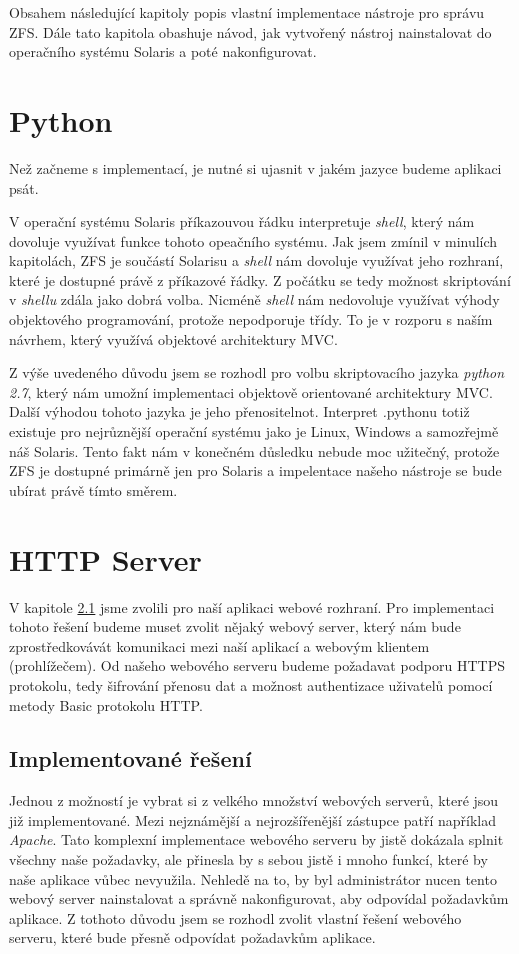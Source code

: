 Obsahem následující kapitoly popis vlastní implementace nástroje pro správu ZFS. Dále tato kapitola obashuje návod, jak vytvořený nástroj nainstalovat do operačního systému Solaris a poté nakonfigurovat.
\section{Python}
Než začneme s implementací, je nutné si ujasnit v jakém jazyce budeme aplikaci psát.

V operační systému Solaris příkazouvou řádku interpretuje \emph{shell}, který nám dovoluje využívat funkce tohoto opeačního systému. Jak jsem zmínil v minulích kapitolách, ZFS je součástí Solarisu a \emph{shell} nám dovoluje využívat jeho rozhraní, které je dostupné právě z příkazové řádky. Z počátku se tedy možnost skriptování v \emph{shellu} zdála jako dobrá volba. Nicméně \emph{shell} nám nedovoluje využívat výhody objektového programování, protože nepodporuje třídy. To je v rozporu s naším návrhem, který využívá objektové architektury MVC.

Z výše uvedeného důvodu jsem se rozhodl pro volbu skriptovacího jazyka \emph{python 2.7}, který nám umožní implementaci objektově orientované architektury MVC. Další výhodou tohoto jazyka je jeho přenositelnot. Interpret \emph.{pythonu} totiž existuje pro nejrůznější operační systému jako je Linux, Windows a samozřejmě náš Solaris. Tento fakt nám v konečném důsledku nebude moc užitečný, protože ZFS je dostupné primárně jen pro Solaris a impelentace našeho nástroje se bude ubírat právě tímto směrem.
\section{HTTP Server}
V kapitole \ref{} jsme zvolili pro naší aplikaci webové rozhraní. Pro implementaci tohoto řešení budeme muset zvolit nějaký webový server, který nám bude zprostředkovávát komunikaci mezi naší aplikací a webovým klientem (prohlížečem). Od našeho webového serveru budeme požadavat podporu HTTPS protokolu, tedy šifrování přenosu dat a možnost authentizace uživatelů pomocí metody Basic protokolu HTTP.
    \subsection{Implementované řešení}
    Jednou z možností je vybrat si z velkého množství webových serverů, které jsou již implementované. Mezi nejznámější a nejrozšířenější zástupce patří například \emph{Apache}. Tato komplexní implementace webového serveru by jistě dokázala splnit všechny naše požadavky, ale přinesla by s sebou jistě i mnoho funkcí, které by naše aplikace vůbec nevyužila. Nehledě na to, by byl administrátor nucen tento webový server nainstalovat a správně nakonfigurovat, aby odpovídal požadavkům aplikace. Z tothoto důvodu jsem se rozhodl zvolit vlastní řešení webového serveru, které bude přesně odpovídat požadavkům aplikace.
